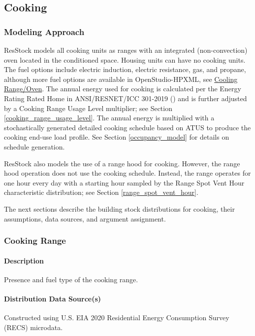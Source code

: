 \subsection{Cooking}
\subsubsection{Modeling Approach}
ResStock models all cooking units as ranges with an integrated (non-convection) oven located in the conditioned space. Housing units can have no cooking units. The fuel options include electric induction, electric resistance, gas, and propane, although more fuel options are available in OpenStudio-HPXML, see \href{https://openstudio-hpxml.readthedocs.io/en/v1.8.1/workflow_inputs.html#hpxml-cooking-range-oven}{Cooling Range/Oven}. The annual energy used for cooking is calculated per the Energy Rating Rated Home in ANSI/RESNET/ICC 301-2019 (\cite{ansi_resnet_301_2019}) and is further adjusted by a Cooking Range Usage Level multiplier; see Section \ref{cooking_range_usage_level}. The annual energy is multiplied with a stochastically generated detailed cooking schedule based on ATUS to produce the cooking end-use load profile. See Section \ref{occupancy_model} for details on schedule generation.

ResStock also models the use of a range hood for cooking. However, the range hood operation does not use the cooking schedule. Instead, the range operates for one hour every day with a starting hour sampled by the Range Spot Vent Hour characteristic distribution; see Section \ref{range_spot_vent_hour}.

The next sections describe the building stock distributions for cooking, their assumptions, data sources, and argument assignment.

\subsubsection{Cooking Range}
\paragraph{Description}
Presence and fuel type of the cooking range.

\paragraph{Distribution Data Source(s)}

Constructed using U.S. EIA 2020 Residential Energy Consumption Survey (RECS) microdata. 

